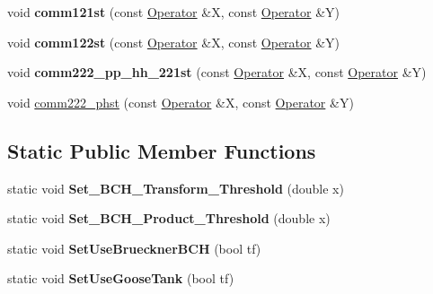 \begin{DoxyCompactItemize}
\item 
void {\bfseries comm121st} (const \hyperlink{classOperator}{Operator} \&X, const \hyperlink{classOperator}{Operator} \&Y)\hypertarget{classOperator_aa2d57c0b2c5564d60e478eb10649ac3a}{}\label{classOperator_aa2d57c0b2c5564d60e478eb10649ac3a}

\item 
void {\bfseries comm122st} (const \hyperlink{classOperator}{Operator} \&X, const \hyperlink{classOperator}{Operator} \&Y)\hypertarget{classOperator_abc49b2355a2b45a6636fc99899a70616}{}\label{classOperator_abc49b2355a2b45a6636fc99899a70616}

\item 
void {\bfseries comm222\+\_\+pp\+\_\+hh\+\_\+221st} (const \hyperlink{classOperator}{Operator} \&X, const \hyperlink{classOperator}{Operator} \&Y)\hypertarget{classOperator_a18deafc783e666ae2f9021a2a5dec2cb}{}\label{classOperator_a18deafc783e666ae2f9021a2a5dec2cb}

\item 
void \hyperlink{classOperator_a85ffd47b8d0db4cdbb6ef4684adbedeb}{comm222\+\_\+phst} (const \hyperlink{classOperator}{Operator} \&X, const \hyperlink{classOperator}{Operator} \&Y)
\end{DoxyCompactItemize}
\subsection*{Static Public Member Functions}
\begin{DoxyCompactItemize}
\item 
static void {\bfseries Set\+\_\+\+B\+C\+H\+\_\+\+Transform\+\_\+\+Threshold} (double x)\hypertarget{classOperator_a6f505221635444cb0b489b9ac600fd61}{}\label{classOperator_a6f505221635444cb0b489b9ac600fd61}

\item 
static void {\bfseries Set\+\_\+\+B\+C\+H\+\_\+\+Product\+\_\+\+Threshold} (double x)\hypertarget{classOperator_a2c42843a1a557f2ab568d106e8fd23e8}{}\label{classOperator_a2c42843a1a557f2ab568d106e8fd23e8}

\item 
static void {\bfseries Set\+Use\+Brueckner\+B\+CH} (bool tf)\hypertarget{classOperator_a574e27d0c3ddc107b51eafcb6bfd4b99}{}\label{classOperator_a574e27d0c3ddc107b51eafcb6bfd4b99}

\item 
static void {\bfseries Set\+Use\+Goose\+Tank} (bool tf)\hypertarget{classOperator_a02668429f1779193801219a2b45e4776}{}\label{classOperator_a02668429f1779193801219a2b45e4776}

\end{DoxyCompactItemize}
